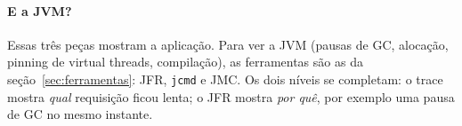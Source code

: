\paragraph{E a JVM?}
Essas três peças mostram a aplicação. Para ver a JVM (pausas de GC,
alocação, pinning de virtual threads, compilação), as ferramentas são as
da seção~\ref{sec:ferramentas}: JFR, \texttt{jcmd} e JMC. Os dois níveis
se completam: o trace mostra \emph{qual} requisição ficou lenta; o JFR
mostra \emph{por quê}, por exemplo uma pausa de GC no mesmo instante.

